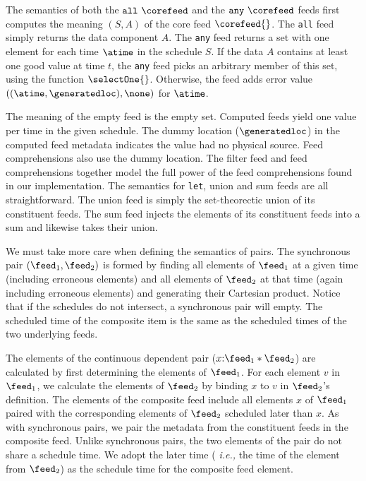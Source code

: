 The semantics of both the $\mathtt{all}\ \corefeed$ and the
$\mathtt{any}\ \corefeed$ feeds first computes the meaning $(S,A)$ of the
core feed $\corefeed{}$.  The \texttt{all} feed simply returns the
data component $A$.  The \texttt{any} feed returns a set with one
element for each time $\atime$ in the schedule $S$.  If the data $A$
contains at least one good value at time $t$, the \texttt{any} feed
picks an arbitrary member of this set, using the function
$\selectOne{}$.  Otherwise, the feed adds  
error value $((\atime,\generatedloc), \none)$ for $\atime$.

The meaning of the empty feed is the empty set.  Computed feeds yield
one value per time in the given schedule.  The dummy location
($\generatedloc$) in the computed feed metadata indicates the value had no physical
source.  Feed comprehensions also use the dummy location.  The filter feed and feed
comprehensions together model the full power of the feed
comprehensions found in our implementation. The semantics for
\texttt{let}, union and sum feeds are all straightforward.  The union
feed is simply the set-theorectic union of its constituent feeds.  The
sum feed injects the elements of its constituent feeds into a sum and
likewise takes their union.

We must take more care when defining the semantics of pairs.  The
synchronous pair $(\feed_1,\feed_2)$ is formed by finding all elements
of $\feed_1$ at a given time (including erroneous elements) and all
elements of $\feed_2$ at that time (again including erroneous
elements) and generating their Cartesian product.  Notice that if
the schedules do not intersect, a synchronous pair will empty.
The scheduled time of the composite item is the same as the scheduled
times of the two underlying feeds. 

The elements of the continuous dependent pair ($x{:}\feed_1 *
\feed_2$) are calculated by first determining the elements of
$\feed_1$.  For each element $v$ in $\feed_1$, we calculate the
elements of $\feed_2$ by binding $x$ to $v$ in $\feed_2$'s definition.
The elements of the composite feed include all elements $x$ of
$\feed_1$ paired with the corresponding elements of $\feed_2$
scheduled later than $x$.  As with synchronous pairs, we pair the
metadata from the constituent feeds in the composite feed. Unlike 
synchronous pairs, the two elements of the pair
do not share a schedule time.  We adopt the later time ({\em
  i.e.,} the time of the element from $\feed_2$) as the schedule time
for the composite feed element.

